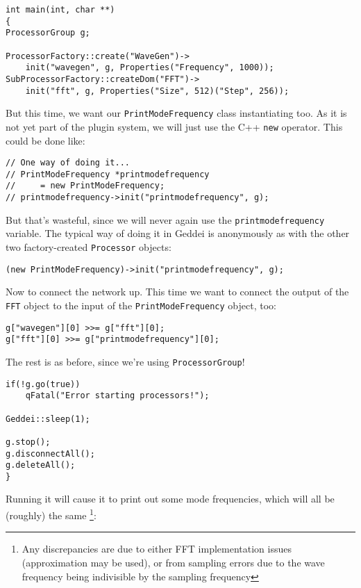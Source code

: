 \begin{verbatim}
int main(int, char **)
{
ProcessorGroup g;

ProcessorFactory::create("WaveGen")->
    init("wavegen", g, Properties("Frequency", 1000));
SubProcessorFactory::createDom("FFT")->
    init("fft", g, Properties("Size", 512)("Step", 256));
\end{verbatim}

But this time, we want our \texttt{PrintModeFrequency} class instantiating too. As it is not yet part of the plugin system, we will just use the C++ \texttt{new} operator. This could be done like:

\begin{verbatim}
// One way of doing it...
// PrintModeFrequency *printmodefrequency
//     = new PrintModeFrequency;
// printmodefrequency->init("printmodefrequency", g);
\end{verbatim} 

But that's wasteful, since we will never again use the \texttt{printmodefrequency} variable. The typical way of doing it in Geddei is anonymously as with the other two factory-created \texttt{Processor} objects:

\begin{verbatim}
(new PrintModeFrequency)->init("printmodefrequency", g);
\end{verbatim}

Now to connect the network up. This time we want to connect the output of the \texttt{FFT} object to the input of the \texttt{PrintModeFrequency} object, too:

\begin{verbatim}
g["wavegen"][0] >>= g["fft"][0];
g["fft"][0] >>= g["printmodefrequency"][0];
\end{verbatim}

The rest is as before, since we're using \texttt{ProcessorGroup}!

\begin{verbatim}
if(!g.go(true))
    qFatal("Error starting processors!");

Geddei::sleep(1);

g.stop();
g.disconnectAll();
g.deleteAll();
}
\end{verbatim}

Running it will cause it to print out some mode frequencies, which will all be (roughly) the same \footnote{Any discrepancies are due to either FFT implementation issues (approximation may be used), or from sampling errors due to the wave frequency being indivisible by the sampling frequency}:

